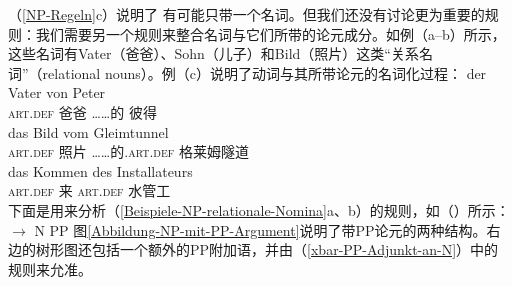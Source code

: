（\ref{NP-Regeln}c）说明了 \nbarc 有可能只带一个名词。但我们还没有讨论更为重要的规则：我们需要另一个规则来整合名词与它们所带的论元成分。如例（a--b）所示，这些名词有Vater（爸爸）、Sohn（儿子）和Bild（照片）这类“关系名词”（relational nouns）。例（c）说明了动词与其所带论元的名词化过程：
\eal
\label{Beispiele-NP-relationale-Nomina}
\ex 
\gll der Vater von Peter\\
	 \textsc{art}.\textsc{def} 爸爸 ……的 彼得\\
\ex 
\gll das Bild vom Gleimtunnel\\
	 \textsc{art}.\textsc{def} 照片 ……的.\textsc{art}.\textsc{def} 格莱姆隧道\\
\ex 
\gll das Kommen des Installateurs\\
	 \textsc{art}.\textsc{def} 来 \textsc{art}.\textsc{def} 水管工\\
\zl
\noindent
下面是用来分析（\ref{Beispiele-NP-relationale-Nomina}a、b）的规则，如（）所示：
\ea
\nbar $\to$ N PP
\z
%
图\ref{Abbildung-NP-mit-PP-Argument}说明了带PP论元的两种结构。右边的树形图还包括一个额外的PP附加语，并由（\ref{xbar-PP-Adjunkt-an-N}）中的规则来允准。
